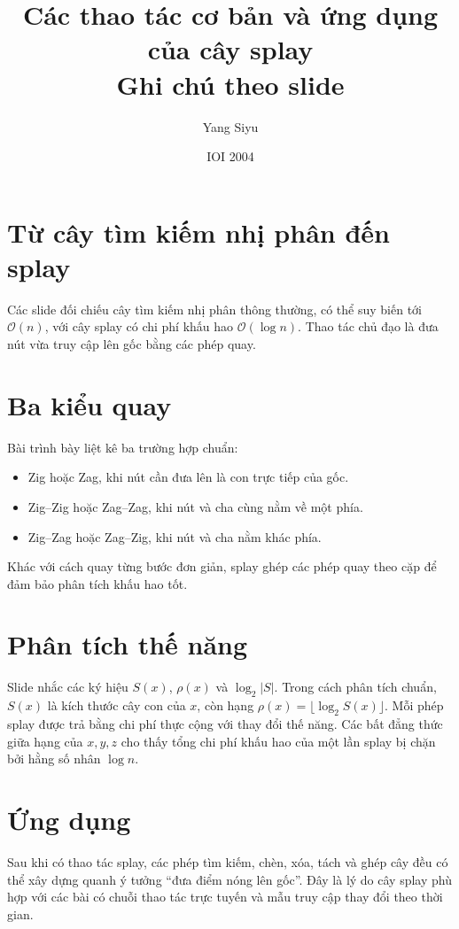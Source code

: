 \documentclass[11pt]{article}
\title{Các thao tác cơ bản và ứng dụng của cây splay\\{\large Ghi chú theo slide}}
\author{Yang Siyu}
\date{IOI 2004}
\newcommand{\Oh}{\mathcal{O}}
\begin{document}
\maketitle


\section{Từ cây tìm kiếm nhị phân đến splay}

Các slide đối chiếu cây tìm kiếm nhị phân thông thường, có thể suy biến tới
\(\Oh(n)\), với cây splay có chi phí khấu hao \(\Oh(\log n)\). Thao tác chủ
đạo là đưa nút vừa truy cập lên gốc bằng các phép quay.

\section{Ba kiểu quay}

Bài trình bày liệt kê ba trường hợp chuẩn:
\begin{itemize}
  \item Zig hoặc Zag, khi nút cần đưa lên là con trực tiếp của gốc.
  \item Zig--Zig hoặc Zag--Zag, khi nút và cha cùng nằm về một phía.
  \item Zig--Zag hoặc Zag--Zig, khi nút và cha nằm khác phía.
\end{itemize}
Khác với cách quay từng bước đơn giản, splay ghép các phép quay theo cặp để
đảm bảo phân tích khấu hao tốt.

\section{Phân tích thế năng}

Slide nhắc các ký hiệu \(S(x)\), \(\rho(x)\) và \(\log_2 |S|\). Trong cách
phân tích chuẩn, \(S(x)\) là kích thước cây con của \(x\), còn hạng
\(\rho(x)=\lfloor \log_2 S(x)\rfloor\). Mỗi phép splay được trả bằng chi phí
thực cộng với thay đổi thế năng. Các bất đẳng thức giữa hạng của \(x,y,z\)
cho thấy tổng chi phí khấu hao của một lần splay bị chặn bởi hằng số nhân
\(\log n\).

\section{Ứng dụng}

Sau khi có thao tác splay, các phép tìm kiếm, chèn, xóa, tách và ghép cây đều
có thể xây dựng quanh ý tưởng ``đưa điểm nóng lên gốc''. Đây là lý do cây
splay phù hợp với các bài có chuỗi thao tác trực tuyến và mẫu truy cập thay
đổi theo thời gian.
\end{document}
